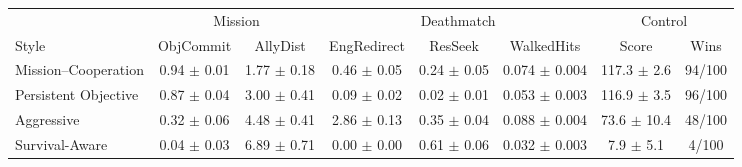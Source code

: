 \begin{tabular}{lccccccc}
\toprule
 & \multicolumn{2}{c}{Mission} & \multicolumn{3}{c}{Deathmatch} & \multicolumn{2}{c}{Control} \\
\cmidrule(lr){2-3}\cmidrule(lr){4-6}\cmidrule(lr){7-8}
Style & ObjCommit & AllyDist & EngRedirect & ResSeek & WalkedHits & Score & Wins \\
\midrule
Mission--Cooperation & 0.94 $\pm$ 0.01 & 1.77 $\pm$ 0.18 & 0.46 $\pm$ 0.05 & 0.24 $\pm$ 0.05 & 0.074 $\pm$ 0.004 & 117.3 $\pm$ 2.6 & 94/100 \\
Persistent Objective & 0.87 $\pm$ 0.04 & 3.00 $\pm$ 0.41 & 0.09 $\pm$ 0.02 & 0.02 $\pm$ 0.01 & 0.053 $\pm$ 0.003 & 116.9 $\pm$ 3.5 & 96/100 \\
Aggressive & 0.32 $\pm$ 0.06 & 4.48 $\pm$ 0.41 & 2.86 $\pm$ 0.13 & 0.35 $\pm$ 0.04 & 0.088 $\pm$ 0.004 & 73.6 $\pm$ 10.4 & 48/100 \\
Survival-Aware & 0.04 $\pm$ 0.03 & 6.89 $\pm$ 0.71 & 0.00 $\pm$ 0.00 & 0.61 $\pm$ 0.06 & 0.032 $\pm$ 0.003 & 7.9 $\pm$ 5.1 & 4/100 \\
\bottomrule
\end{tabular}
